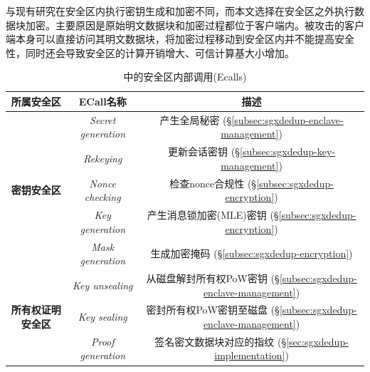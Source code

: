 与现有研究\cite{kim2019ShieldStore,fuhry2020segshare,djoko2019NEXUS}在安全区内执行密钥生成和加密不同，而本文选择在安全区之外执行数据块加密。主要原因是原始明文数据块和加密过程都位于客户端内。被攻击的客户端本身可以直接访问其明文数据块，将加密过程移动到安全区内并不能提高安全性，同时还会导致安全区的计算开销增大、可信计算基大小增加。

\begin{table}[!htb]
    \small
    \centering
    \begin{tabular}{ccc}
        \toprule
        {\bf 所属安全区} & {\bf ECall名称}            & {\bf 描述}                                                           \\ 
        \midrule
        \multirow{5}{*}{\bf 密钥安全区}
                         & \textit{Secret generation} & 产生全局秘密 
        (\S\ref{subsec:sgxdedup-enclave-management})                                                                         \\
                         & \textit{Rekeying}          & 更新会话密钥 
        (\S\ref{subsec:sgxdedup-key-management})                                                                             \\
                         & \textit{Nonce checking}    & 检查nonce合规性 
        (\S\ref{subsec:sgxdedup-encryption})                                                                                 \\
                         & \textit{Key generation}    & 产生消息锁加密(MLE)密钥 (\S\ref{subsec:sgxdedup-encryption})         \\
                         & \textit{Mask generation}   & 生成加密掩码 (\S\ref{subsec:sgxdedup-encryption})                    \\
        \hline
        \multirow{3}{*}{\bf 所有权证明安全区}
                         & \textit{Key unsealing}     & 从磁盘解封所有权PoW密钥 (\S\ref{subsec:sgxdedup-enclave-management}) \\
                         & \textit{Key sealing}       & 密封所有权PoW密钥至磁盘 (\S\ref{subsec:sgxdedup-enclave-management}) \\
                         & \textit{Proof generation}  & 签名密文数据块对应的指纹 
        (\S\ref{sec:sgxdedup-implementation})                                                                                \\
        \bottomrule
    \end{tabular}
    \caption{\sysnameS 中的安全区内部调用(Ecalls)}
    \label{tab:sgxdedup-ecall}
\end{table}

